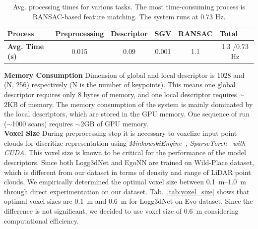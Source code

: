 \begin{table}[h]
  \centering
  \small
  \begin{tabular}{@{}llllll@{}}
  \toprule
  \textbf{Process} & \textbf{Preprocessing} & \textbf{Descriptor} & \textbf{SGV} & \textbf{RANSAC} & \textbf{Total} \\ \midrule
  \textbf{Avg. Time (s)} & \multicolumn{1}{c}{0.015} & \multicolumn{1}{c}{0.09} & \multicolumn{1}{c}{0.001} & \multicolumn{1}{c}{1.1} & \multicolumn{1}{c}{1.3 /0.73 Hz} \\ %
  \bottomrule
  \end{tabular}
  \caption{Avg. processing times for various tasks. The most time-consuming process is RANSAC-based feature matching. The system runs at 0.73 Hz.}
  \label{tab:my-table}
\end{table}
\newline
\textbf{Memory Consumption}\hspace{0.5em} Dimension of global and local descriptor is 1028 and (N, 256) respectively (N is the number of keypoints). This means one global descriptor requires only 8 bytes of memory, and one local descriptor requires $\sim$2KB of memory. The memory consumption of the system is mainly dominated by the local descriptors, which are stored in the GPU memory. One sequence of run ($\sim$1000 scans) requires $\sim$2GB of GPU memory.\\
\newline
\textbf{Voxel Size}\hspace{0.5em} During preprocessing step it is necessary to voxelize input point clouds for discritize representation using \emph{MinkowskiEngine~\cite{choy20194cvpr}, SparseTorch~\cite{tang2023MICRO} with CUDA}. This voxel size is known to be critical for the performance of the model descriptors. Since both Logg3dNet and EgoNN are trained on Wild-Place dataset, which is different from our dataset in terms of density and range of LiDAR point clouds, We empirically determined the optimal voxel size between \SIrange{0.1}{1.0}{\meter} through direct experimentation on our dataset. Tab.~\ref{tab:voxel_size} shows that optimal voxel sizes are \SI{0.1}{\meter} and \SI{0.6}{\meter} for Logg3dNet on Evo dataset. Since the difference is not significant, we decided to use voxel size of \SI{0.6}{\meter} considering computational efficiency.\\

